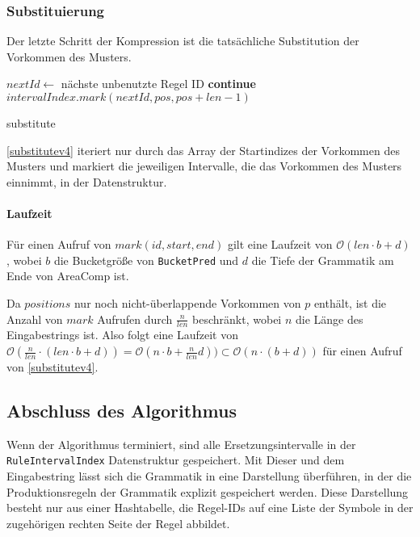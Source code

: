 \subsubsection{Substituierung}

Der letzte Schritt der Kompression ist die tatsächliche Substitution der Vorkommen des Musters.
\begin{algorithm}[t]
        $nextId \leftarrow$ nächste unbenutzte Regel ID\;
         {
             {
                \textbf{continue}\;
            }
            $intervalIndex.mark(nextId, pos, pos + len - 1)$\;
        }
        \caption{substitute}
        \label{substitutev4}
\end{algorithm}

\autoref{substitutev4} iteriert nur durch das Array der Startindizes der Vorkommen des Musters und markiert die jeweiligen Intervalle, die das Vorkommen des Musters einnimmt, in der Datenstruktur. 

\paragraph{Laufzeit}

Für einen Aufruf von $mark(id, start, end)$ gilt eine Laufzeit von $\mathcal{O}(len \cdot b + d)$, wobei $b$ die Bucketgröße von \texttt{BucketPred} und $d$ die Tiefe der Grammatik am Ende von AreaComp ist.

Da $positions$ nur noch nicht-überlappende Vorkommen von $p$ enthält, ist die Anzahl von $mark$ Aufrufen durch $\frac{n}{len}$ beschränkt, wobei $n$ die Länge des Eingabestrings ist.
Also folgt eine Laufzeit von $\mathcal{O}(\tfrac{n}{len} \cdot (len \cdot b + d)) = \mathcal{O}(n \cdot b + \tfrac{n}{len} d)) \subset \mathcal{O}(n \cdot (b + d))$ für einen Aufruf von \autoref{substitutev4}. 

\subsection{Abschluss des Algorithmus}
\label{unify}

Wenn der Algorithmus terminiert, sind alle Ersetzungsintervalle in der \texttt{RuleIntervalIndex} Datenstruktur gespeichert.
Mit Dieser und dem Eingabestring lässt sich die Grammatik in eine Darstellung überführen, in der die Produktionsregeln der Grammatik explizit gespeichert werden. Diese Darstellung besteht nur aus einer Hashtabelle, die Regel-IDs auf eine Liste der Symbole in der zugehörigen rechten Seite der Regel abbildet. 


